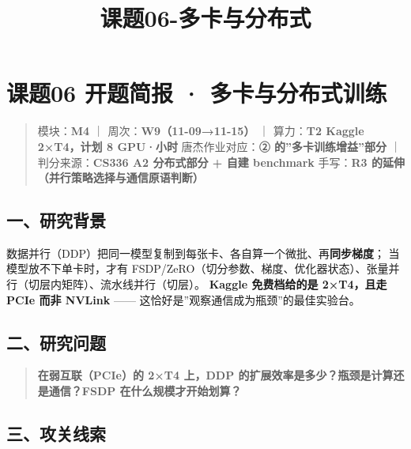 \documentclass[
  chinese,
  11pt,
]{ctexart}
\title{课题06-多卡与分布式}
\author{}
\date{}
\begin{document}
\maketitle

{
\setcounter{tocdepth}{2}
\tableofcontents
}
\section{课题06 开题简报 · 多卡与分布式训练}\label{ux8bfeux989806-ux5f00ux9898ux7b80ux62a5-ux591aux5361ux4e0eux5206ux5e03ux5f0fux8badux7ec3}

\begin{quote}
模块：\textbf{M4} ｜ 周次：\textbf{W9（11-09→11-15）} ｜ 算力：\textbf{T2 Kaggle 2×T4，计划 8 GPU·小时} 唐杰作业对应：\textbf{② 的''多卡训练增益''部分} ｜ 判分来源：\textbf{CS336 A2 分布式部分 + 自建 benchmark} 手写：\textbf{R3 的延伸（并行策略选择与通信原语判断）}
\end{quote}

\subsection{一、研究背景}\label{ux4e00ux7814ux7a76ux80ccux666f}

数据并行（DDP）把同一模型复制到每张卡、各自算一个微批、再\textbf{同步梯度}； 当模型放不下单卡时，才有 FSDP/ZeRO（切分参数、梯度、优化器状态）、张量并行（切层内矩阵）、流水线并行（切层）。 \textbf{Kaggle 免费档给的是 2×T4，且走 PCIe 而非 NVLink} ------ 这恰好是''观察通信成为瓶颈''的最佳实验台。

\subsection{二、研究问题}\label{ux4e8cux7814ux7a76ux95eeux9898}

\begin{quote}
\textbf{在弱互联（PCIe）的 2×T4 上，DDP 的扩展效率是多少？瓶颈是计算还是通信？FSDP 在什么规模才开始划算？}
\end{quote}

\subsection{三、攻关线索}\label{ux4e09ux653bux5173ux7ebfux7d22}
\end{document}
